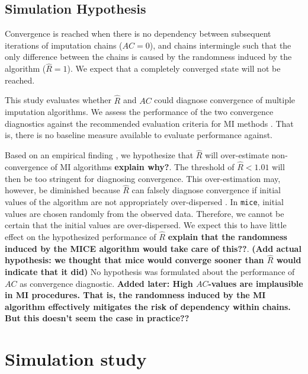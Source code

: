 \documentclass[Royal,times,sageh]{sagej}
\begin{document}
\hypertarget{simulation-hypothesis}{%
\subsection{Simulation Hypothesis}\label{simulation-hypothesis}}

Convergence is reached when there is no dependency between subsequent
iterations of imputation chains (\(AC = 0\)), and chains intermingle
such that the only difference between the chains is caused by the
randomness induced by the algorithm (\(\widehat{R} = 1\)). We expect
that a completely converged state will not be reached.

This study evaluates whether \(\widehat{R}\) and \(AC\) could diagnose
convergence of multiple imputation algorithms. We assess the performance
of the two convergence diagnostics against the recommended evaluation
criteria for MI methods \citep[i.e., average bias, average confidence
interval width, and empirical coverage rate across simulations;][\(\S\)
2.5.2]{buur18}. That is, there is no baseline measure available to
evaluate performance against.

Based on an empirical finding \citep{lace07}, we hypothesize that
\(\widehat{R}\) will over-estimate non-convergence of MI algorithms
\textbf{explain why?}. The threshold of \(\widehat{R} < 1.01\) will then
be too stringent for diagnosing convergence. This over-estimation may,
however, be diminished because \(\widehat{R}\) can falsely diagnose
convergence if initial values of the algorithm are not appropriately
over-dispersed \citep[p.~437]{broo98}. In \texttt{mice}, initial values
are chosen randomly from the observed data. Therefore, we cannot be
certain that the initial values are over-dispersed. We expect this to
have little effect on the hypothesized performance of \(\widehat{R}\)
\textbf{explain that the randomness induced by the MICE algorithm would
take care of this??}. \textbf{(Add actual hypothesis: we thought that
mice would converge sooner than \(\widehat{R}\) would indicate that it
did)} No hypothesis was formulated about the performance of \(AC\) as
convergence diagnostic. \textbf{Added later: High \(AC\)-values are
implausible in MI procedures. That is, the randomness induced by the MI
algorithm effectively mitigates the risk of dependency within chains.
But this doesn't seem the case in practice??}

\hypertarget{simulation-study}{%
\section{Simulation study}\label{simulation-study}}
\end{document}
